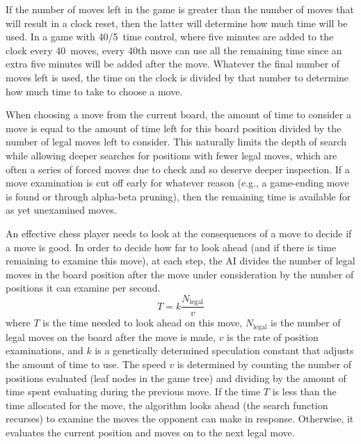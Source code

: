 \documentclass[letterpaper]{article}
\renewcommand{\_}{\allowbreak\textunderscore\allowbreak}
\begin{document}
If the number of moves left in the game is greater than the number of moves that will result in a clock reset, then the latter will determine how much time will be used. In a game with 40/5~time control, where five minutes are added to the clock every 40~moves, every 40th move can use all the remaining time since an extra five minutes will be added after the move. Whatever the final number of moves left is used, the time on the clock is divided by that number to determine how much time to take to choose a move.

When choosing a move from the current board, the amount of time to consider a move is equal to the amount of time left for this board position divided by the number of legal moves left to consider. This naturally limits the depth of search while allowing deeper searches for positions with fewer legal moves, which are often a series of forced moves due to check and so deserve deeper inspection. If a move examination is cut off early for whatever reason (e.g., a game-ending move is found or through alpha-beta pruning), then the remaining time is available for as yet unexamined moves.

An effective chess player needs to look at the consequences of a move to decide if a move is good. In order to decide how far to look ahead (and if there is time remaining to examine this move), at each step, the AI divides the number of legal moves in the board position after the move under consideration by the number of positions it can examine per second.
\[
T = k\frac{N_{\textrm{legal}}}{v}
\]
where \(T\) is the time needed to look ahead on this move, \(N_{\textrm{legal}}\) is the number of legal moves on the board after the move is made, \(v\) is the rate of position examinations, and \(k\) is a genetically determined speculation constant that adjusts the amount of time to use. The speed \(v\) is determined by counting the number of positions evaluated (leaf nodes in the game tree) and dividing by the amount of time spent evaluating during the previous move. If the time \(T\) is less than the time allocated for the move, the algorithm looks ahead (the search function recurses) to examine the moves the opponent can make in response. Otherwise, it evaluates the current position and moves on to the next legal move.
\end{document}
